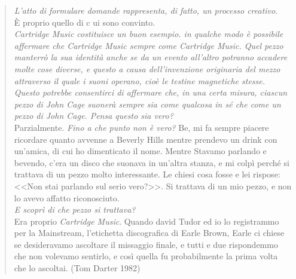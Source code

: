 \begin{quote}
	\emph{L'atto di formulare domande rappresenta, di fatto, un processo creativo}.\\
	È proprio quello di c ui sono convinto.\\
	\emph{\emph{Cartridge Music} costituisce un buon esempio. in qualche modo è possibile affermare che \emph{Cartridge Music} sempre come \emph{Cartridge Music}. Quel pezzo manterrò la sua identità anche se da un evento all'altro potranno accadere molte cose diverse, e questo a causa dell'invenzione originaria del mezzo attraverso il quale i suoni operano, cioè le testine magnetiche stesse. Questo potrebbe consentirci di affermare che, in una certa misura, ciascun pezzo di John Cage suonerà sempre sia come qualcosa in sé che come un pezzo di John Cage. Pensa questo sia vero?} \\
	Parzialmente.
	\emph{Fino a che punto non è vero?}
	Be, mi fa sempre piacere ricordare quanto avvenne a Beverly Hills mentre prendevo un drink con un'amica, di cui ho dimenticato il nome. Mentre Stavamo parlando e bevendo, c'era un disco che suonava in un'altra stanza, e mi colpì perché si trattava di un pezzo molto interessante. Le chiesi cosa fosse e lei rispose: <<Non stai parlando sul serio vero?>>. Si trattava di un mio pezzo, e non lo avevo affatto riconosciuto.\\
	\emph{E scoprì di che pezzo si trattava?}\\
	Era proprio \emph{Cartridge Music}. Quando david Tudor ed io lo registrammo per la Mainstream, l'etichetta discografica di Earle Brown, Earle ci chiese se desideravamo ascoltare il missaggio finale, e tutti e due rispondemmo che non volevamo sentirlo, e così quella fu probabilmente la prima volta che lo ascoltai. (Tom Darter 1982)

\end{quote}

